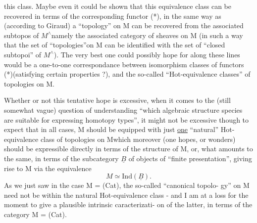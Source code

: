 
this class.  Maybe even it could be shown that this equivalence class
can be recovered in terms of the corresponding functor (*),  in the same
way as (according to Giraud) a ``topology'' on M can be recovered from
the associated subtopos of $M^{\wedge}$\hand{,}namely the associated category of sheaves
on M (in such a way that the set of ``topologies''on M can be
identified with the set of ``closed subtopoi'' of $M^{\wedge}$).  The very best
one could possibly hope for along these lines would be a one-to-one
correspondance between isomorphism classes of functors (*)(satisfying
certain properties ?),  and the so-called ``Hot-equivalence classes'' of
topologies on M.

Whether or not this tentative hope is excessive, when it comes to
the (still somewhat vague) question of understanding ``which algebraic
structure species are suitable for expressing homotopy types'',  it
might not be excessive though to expect that in all  cases,  M should
be equipped with just \uline{one} ``natural'' Hot-equivalence class of topologies
on M\hand{,}which moreover (one hopes,  or wonders) should be expressible
directly in terms of the  structure of M,  or,  what amounts to the same,
in terms of the  subcategory $\underline{B}$ of objects of ``finite presentation'',  
giving rise to M via the equivalence
\[ M \simeq \mathrm{Ind}(\underline{B}) . \]
As we just saw in the case  M = (Cat),  the so-called ``canonical topolo-%
gy'' on M need not be within the natural Hot-equivalence class  -  and I
am at a loss for the moment to give a plausible intrinsic caracterizati-%
on of the latter,  in terms of the category M = (Cat). 

